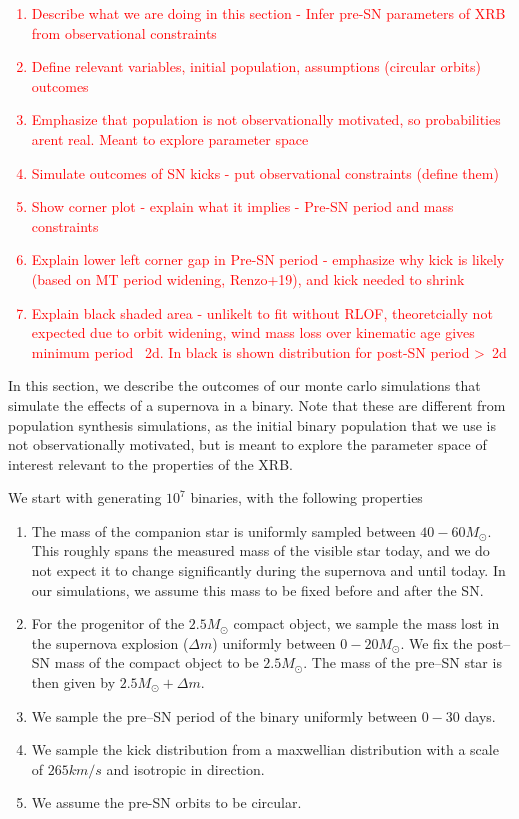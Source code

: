 \documentclass[linenumbers,trackchanges,twocolumn]{aastex701}
\newcommand{\red}{\textcolor{red}}
\begin{document}
\red{
\begin{enumerate}
    \item Describe what we are doing in this section - Infer pre-SN parameters of XRB from observational constraints
    \item Define relevant variables, initial population, assumptions (circular orbits) outcomes
    \item Emphasize that population is not observationally motivated, so probabilities arent real. Meant to explore parameter space
    \item Simulate outcomes of SN kicks - put observational constraints (define them)
    \item Show corner plot - explain what it implies - Pre-SN period and mass constraints
    \item Explain lower left corner gap in Pre-SN period - emphasize why kick is likely (based on MT period widening, Renzo+19), and kick needed to shrink
    \item Explain black shaded area - unlikelt to fit without RLOF, theoretcially not expected due to orbit widening, wind mass loss over kinematic age gives minimum period ~2d. In black is shown distribution for post-SN period >~2d
\end{enumerate}
}

In this section, we describe the outcomes of our monte carlo simulations that simulate the effects of a supernova in a binary. Note that these are different from population synthesis simulations, as the initial binary population that we use is not observationally motivated, but is meant to explore the parameter space of interest relevant to the properties of the XRB.

We start with generating $10^7$ binaries, with the following properties

\begin{enumerate}
        \item The mass of the companion star is uniformly sampled between $40-60M_{\odot}$. This roughly spans the measured mass of the visible star today, and we do not expect it to change significantly during the supernova and until today. In our simulations, we assume this mass to be fixed before and after the SN.
        \item For the progenitor of the $2.5M_{\odot}$ compact object, we sample the mass lost in the supernova explosion ($\Delta m$) uniformly between $0-20M_{\odot}$. We fix the post--SN mass of the compact object to be $2.5M_{\odot}$. The mass of the pre--SN star is then given by $2.5M_{\odot}+\Delta m$.
        \item We sample the pre--SN period of the binary uniformly between $0-30$ days.
        \item We sample the kick distribution from a maxwellian distribution with a scale of $265 km/s$ and isotropic in direction.
        \item We assume the pre-SN orbits to be circular.
\end{enumerate}
\end{document}
